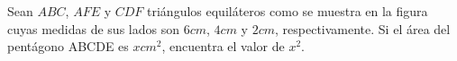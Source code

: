Sean $ABC$, $AFE$ y $CDF$ triángulos equiláteros como se muestra en la figura cuyas medidas de sus lados son $6 cm$, $4 cm$ y $2 cm$, respectivamente. Si el área del pentágono ABCDE es $x cm^2$, encuentra el valor de $x^2$.